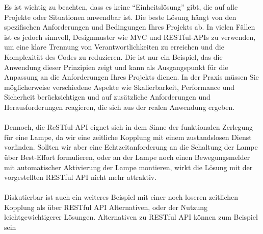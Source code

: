 Es ist wichtig zu beachten, dass es keine \enquote{Einheitslösung} gibt, die auf alle Projekte oder Situationen anwendbar ist. Die beste Lösung hängt von den spezifischen Anforderungen und Bedingungen Ihres Projekts ab. In vielen Fällen ist es jedoch sinnvoll, Designmuster wie MVC und RESTful-APIs zu verwenden, um eine klare Trennung von Verantwortlichkeiten zu erreichen und die Komplexität des Codes zu reduzieren. Die ist nur ein Beispiel, das die Anwendung dieser Prinzipien zeigt und kann als Ausgangspunkt für die Anpassung an die Anforderungen Ihres Projekts dienen. In der Praxis müssen Sie möglicherweise verschiedene Aspekte wie Skalierbarkeit, Performance und Sicherheit berücksichtigen und auf zusätzliche Anforderungen und Herausforderungen reagieren, die sich aus der realen Anwendung ergeben.
\\\\
Dennoch, die ReSTful-API eignet sich in dem Sinne der funktionalen Zerlegung für eine Lampe, da wir eine zeitliche Kopplung mit einem zustandslosen Dienst vorfinden. Sollten wir aber eine Echtzeitanforderung an die Schaltung der Lampe über Best-Effort formulieren, oder an der Lampe noch einen Bewegungsmelder mit automatischer Aktivierung der Lampe montieren, wirkt die Lösung mit der vorgestellten RESTful API nicht mehr attraktiv. 
\\\\
Diskutierbar ist auch ein weiteres Beispiel mit einer noch loseren zeitlichen Kopplung als über RESTful API Alternativen, oder der Nutzung leichtgewichtigerer Lösungen.
Alternativen zu RESTful API können zum Beispiel sein
